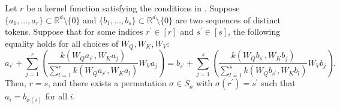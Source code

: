 \documentclass[10pt,a4paper]{amsart}
\begin{document}
\begin{lemma}
    \label{lem:equal_atten}
    Let $r$ be a kernel function satisfying the conditions in .
    Suppose $\{a_1, \dots, a_r\}\subset \mathbb{R}^d\setminus \{0\}$ and $\{b_1,\dots, b_s\}\subset \mathbb{R}^d\setminus \{0\}$ are two sequences of distinct tokens. Suppose that for some indices $r^\prime\in [r]$ and $s^\prime\in [s]$, the following equality holds for all choices of $W_Q, W_K, W_V$:
    \begin{equation}
        \label{eq:lem_equal_atten}
        a_{r^\prime}+\sum_{j=1}^r\left(\frac{ k(W_Q a_{r^\prime}, W_K a_j)}{\sum_{l=1}^r k(W_Q a_{r^\prime}, W_K a_l)} W_V a_j\right) =
        b_{s^\prime}+\sum_{j=1}^s\left(\frac{ k(W_Q b_{s^\prime}, W_K b_j)}{\sum_{l=1}^s k(W_Q b_{s^\prime}, W_K b_l)} W_V b_j\right).
    \end{equation}
    Then, $r=s$, and there exists a permutation $\sigma\in{S}_n$ with $\sigma(r^\prime)=s^\prime$ such that $a_i=b_{\sigma(i)}$ for all $i$.
\end{lemma}
\end{document}
